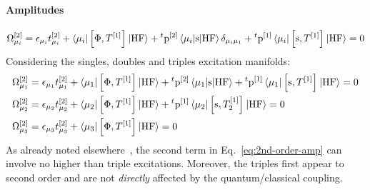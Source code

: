 \paragraph*{Amplitudes}
\begin{equation}\label{eq:2nd-order-amp}
  \Omega_{\mu_i}^{[2]} = \epsilon_{\mu_i}t_{\mu_i}^{[2]}
  + \braket{\mu_i | \left[ \Phi, T^{[1]} \right]^{} | \mathrm{HF}}
  + {}^t\mathrm{p}^{[2]}\braket{\mu_i | \mathrm{s} | \mathrm{HF}}\delta_{\mu_i\mu_1}
  + {}^t\mathrm{p}^{[1]}\braket{\mu_i | \left[ \mathrm{s}, T^{[1]} \right]^{} |
  \mathrm{HF}}
  = 0
\end{equation}
Considering the singles, doubles and triples excitation manifolds:
\begin{subequations}
  \begin{align}
  \Omega_{\mu_1}^{[2]} &= \epsilon_{\mu_1}t_{\mu_1}^{[2]}
  + \braket{\mu_1 | \left[ \Phi, T^{[1]} \right]^{} | \mathrm{HF}}
  + {}^t\mathrm{p}^{[2]}\braket{\mu_1 | \mathrm{s} | \mathrm{HF}}
  + {}^t\mathrm{p}^{[1]}\braket{\mu_1 | \left[ \mathrm{s}, T^{[1]} \right]^{} |
  \mathrm{HF}}
  = 0 \\
  \Omega_{\mu_2}^{[2]} &= \epsilon_{\mu_2}t_{\mu_2}^{[2]}
  + \braket{\mu_2 | \left[ \Phi, T^{[1]} \right]^{} | \mathrm{HF}}
  + {}^t\mathrm{p}^{[1]}\braket{\mu_2 | \left[ \mathrm{s}, T_2^{[1]} \right]^{} |
  \mathrm{HF}}
  = 0 \\
  \Omega_{\mu_3}^{[2]} &= \epsilon_{\mu_3}t_{\mu_3}^{[2]}
  + \braket{\mu_3 | \left[ \Phi, T^{[1]} \right]^{} | \mathrm{HF}}
  = 0
  \end{align}
\end{subequations}
As already noted elsewhere~\autocite{Koch1997-nm, Helgaker2000-tz},
the second term in Eq.~\eqref{eq:2nd-order-amp} can involve no higher
than triple excitations.
Moreover, the triples first appear to second order and are not \emph{directly}
affected by the quantum/classical coupling.

